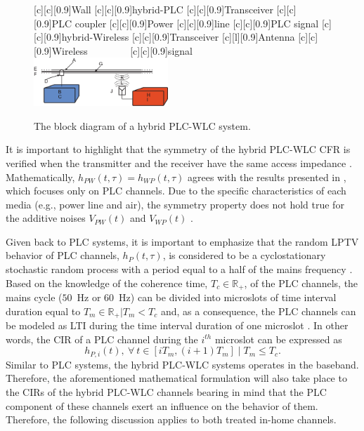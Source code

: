 \documentclass[journal]{IEEEtran}
\begin{document}
\begin{figure}[h]
	\centering
	[c][0.9]{Wall}
	[c][0.9]{hybrid-PLC}
	[c][0.9]{Transceiver}
	[c][0.9]{PLC coupler}
	[c][0.9]{Power}
	[c][0.9]{line}
	[c][0.9]{PLC signal}
	[c][0.9]{hybrid-Wireless}
	[c][0.9]{Transceiver}
	[l][0.9]{Antenna}
	[c][0.9]{Wireless$~~~~~~~~~~~~~~~~~~$}
	[c][0.9]{signal$~~~~~~~~~~~~~~~~~$}
	\includegraphics[width=0.45\textwidth]{images/Hybrid_channel.eps}
	\caption{The block diagram of a hybrid PLC-WLC system.}
	\label{Hybchannel}
\end{figure}

It is important to highlight that the symmetry of the hybrid \ac{PLC}-\ac{WLC} \ac{CFR} is verified when the transmitter and the receiver have the same access impedance \cite{thiago:hyb}. Mathematically, $h_{PW}(t,\tau)=h_{WP}(t,\tau)$ agrees with the results presented in \cite{Galli:indoor}, which focuses only on \ac{PLC} channels. Due to the specific characteristics of each media (e.g., power line and air), the symmetry property does not hold true for the additive noises $V_{PW}(t)$ and $V_{WP}(t)$ \cite{thiago:hyb}. 

Given back to \ac{PLC} systems, it is important to emphasize that the random \ac{LPTV} behavior of \ac{PLC} channels, $h_P(t,\tau)$, is considered to be a cyclostationary stochastic random process with a period equal to a half of the mains frequency \cite{Colen:TCRA}. Based on the knowledge of the coherence time, $T_c \in \mathbb{R}_+$, of the \ac{PLC} channels, the mains cycle ($50$~Hz or $60$~Hz) can be divided into microslots of time interval duration equal to $T_m\in \mathbb{R}_+|T_m < T_c$ and, as a consequence, the \ac{PLC} channels can be modeled as \ac{LTI} during the time interval duration of one microslot \cite{Colen2016}. In other words, the \ac{CIR} of a \ac{PLC} channel during the $i^{th}$ microslot can be expressed as
\begin{equation} \label{discreteh}
h_{P,i}(t),~\forall~t \in [iT_{m}, (i+1)T_{m}] \mid T_{m} \le T_{c}.
\end{equation}
Similar to \ac{PLC} systems, the hybrid \ac{PLC}-\ac{WLC} systems operates in the baseband. Therefore, the aforementioned mathematical formulation will also take place to the \acp{CIR} of the hybrid \ac{PLC}-\ac{WLC} channels bearing in mind that the \ac{PLC} component of these channels exert an influence on the behavior of them. Therefore, the following discussion applies to both treated in-home channels.
\end{document}
